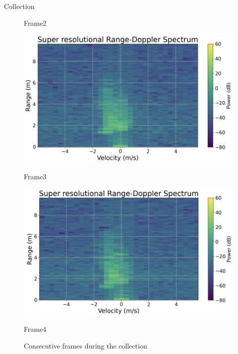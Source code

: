 \documentclass{beamer}
\begin{document}
\begin{frame}[t]{Collection}
\begin{figure}
\begin{minipage}{0.25\textwidth}
            \caption*{\hspace{0.29cm}Frame2}
        \end{minipage}
        \begin{minipage}{0.25\textwidth}
            \centering
            \includegraphics[height=0.75\textwidth]{MA_presentation/figures/frame3.png}
            \caption*{\hspace{0.25cm}Frame3}
        \end{minipage}
        \begin{minipage}{0.25\textwidth}
            \centering
            \includegraphics[height=0.75\textwidth]{MA_presentation/figures/frame4.png}
            \caption*{\hspace{0.29cm}Frame4}
        \end{minipage}
        \vspace{-0.3cm}
        \caption{Consecutive frames during the collection}
    \end{figure}


\end{frame}
\end{document}
